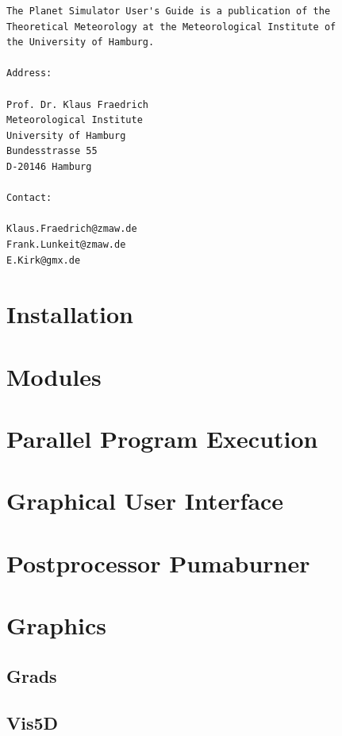 \documentclass[12pt,twoside,a4paper]{book}
\begin{document}
\begin{verbatim}
The Planet Simulator User's Guide is a publication of the
Theoretical Meteorology at the Meteorological Institute of
the University of Hamburg.

Address:

Prof. Dr. Klaus Fraedrich
Meteorological Institute
University of Hamburg
Bundesstrasse 55
D-20146 Hamburg

Contact:

Klaus.Fraedrich@zmaw.de
Frank.Lunkeit@zmaw.de
E.Kirk@gmx.de
\end{verbatim}

\tableofcontents

\chapter{Installation}


\chapter{Modules}




\chapter{Parallel Program Execution}


\chapter{Graphical User Interface}
\label{chap_GUI}


\chapter{Postprocessor Pumaburner}
\label{Pumaburner}


\chapter{Graphics}
\section{Grads}

\section{Vis5D}

\end{document}
